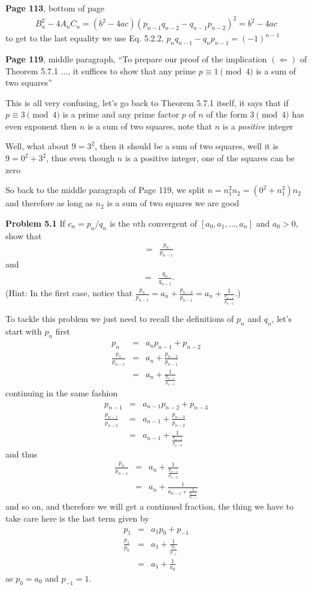 \documentclass[aps,preprint,preprintnumbers,nofootinbib,showpacs,prd]{revtex4-1}
\newcommand{\nbea}{\begin{eqnarray*}}
\newcommand{\neea}{\end{eqnarray*}}
\begin{document}
{\bf Page 113}, bottom of page
%
\nbea
B^2_n - 4A_nC_n = (b^2 - 4ac)(p_{n-1}q_{n-2} - q_{n-1}p_{n-2})^2 = b^2 - 4ac
\neea
%
to get to the last equality we use Eq. 5.2.2, $p_nq_{n-1} - q_np_{n-1} = (-1)^{n-1}$

{\bf Page 119}, middle paragraph, ``To prepare our proof of the implication $(\Longleftarrow)$ of Theorem 5.7.1 $\dots$, it suffices to show that any prime $p\equiv 1 \pmod{4}$ is a sum of two squares''

This is all very confusing, let's go back to Theorem 5.7.1 itself, it says that if $p \equiv 3 \pmod{4}$ is a prime and any prime factor $p$ of $n$ of the form $3 \pmod{4}$ has even exponent then $n$ is a sum of two squares, note that $n$ is a {\it positive} integer

Well, what about $9 = 3^2$, then it should be a sum of two squares, well it is $9 = 0^2 + 3^2$, thus even though $n$ is a positive integer, one of the squares can be zero

So back to the middle paragraph of Page 119, we split $n = n_1^2n_2 = (0^2 + n_1^2)n_2$ and therefore as long as $n_2$ is a sum of two squares we are good

{\bf Problem 5.1} If $c_n = p_n /q_n$ is the $n$th convergent of $[a_0 , a_1 , \dots , a_n ]$ and $a_0 > 0$, show that
%
\nbea
[a_n , a_{n-1} , \dots , a_1 , a_0 ] & = & \frac{p_n}{p_{n-1}}
\neea
%
and
%
\nbea
[a_n , a_{n-1} , \dots , a_2 , a_1 ] & = & \frac{q_n}{q_{n-1}}.
\neea
%
(Hint: In the first case, notice that $\frac{p_n}{p_{n-1}} = a_n + \frac{p_{n-2}}{p_{n-1}} = a_n + \frac{1}{\frac{p_{n-1}}{p_{n-2}}}$.)

To tackle this problem we just need to recall the definitions of $p_n$ and $q_n$, let's start with $p_n$ first
%
\nbea
p_n & = & a_np_{n-1} + p_{n-2} \\
\frac{p_n}{p_{n-1}} & = & a_n + \frac{p_{n-2}}{p_{n-1}} \\
& = & a_n + \frac{1}{\frac{p_{n-1}}{p_{n-2}}}
\neea
%
continuing in the same fashion 
%
\nbea
p_{n-1} & = & a_{n-1}p_{n-2} + p_{n-3} \\
\frac{p_{n-1}}{p_{n-2}} & = & a_{n-1} + \frac{p_{n-3}}{p_{n-2}} \\
& = & a_{n-1} + \frac{1}{\frac{p_{n-2}}{p_{n-3}}}
\neea
%
and thus
%
\nbea
\frac{p_n}{p_{n-1}} & = & a_n + \frac{1}{\frac{p_{n-1}}{p_{n-2}}} \\
& = & a_n + \frac{1}{a_{n-1} + \frac{1}{\frac{p_{n-2}}{p_{n-3}}}}
\neea
%
and so on, and therefore we will get a continued fraction, the thing we have to take care here is the last term given by
%
\nbea
p_1 & = & a_1p_0 + p_{-1} \\
\frac{p_1}{p_0} & = & a_1 + \frac{1}{\frac{p_0}{p_{-1}}} \\
& = &  a_1 + \frac{1}{a_0}
\neea
%
as $p_0 = a_0$ and $p_{-1} = 1$.
\end{document}
